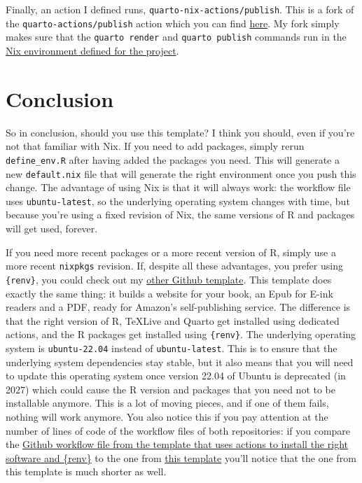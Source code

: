 \documentclass[
  letterpaper,
  paper=6in:9in,
  pagesize=pdftex,
  headinclude=on,
  footinclude=on,
  12pt]{scrbook}
\begin{document}
Finally, an action I defined runs, \texttt{quarto-nix-actions/publish}.
This is a fork of the \texttt{quarto-actions/publish} action which you
can find
\href{https://github.com/quarto-dev/quarto-actions/blob/main/publish/action.yml}{here}.
My fork simply makes sure that the \texttt{quarto\ render} and
\texttt{quarto\ publish} commands run in the
\href{https://github.com/b-rodrigues/quarto-nix-actions/blob/f48f5a7813eb4978a2f557ff45bcc854526fb80b/publish/action.yml\#L58}{Nix
environment defined for the project}.


\chapter{Conclusion}\label{conclusion}

So in conclusion, should you use this template? I think you should, even
if you're not that familiar with Nix. If you need to add packages,
simply rerun \texttt{define\_env.R} after having added the packages you
need. This will generate a new \texttt{default.nix} file that will
generate the right environment once you push this change. The advantage
of using Nix is that it will always work: the workflow file uses
\texttt{ubuntu-latest}, so the underlying operating system changes with
time, but because you're using a fixed revision of Nix, the same
versions of R and packages will get used, forever.

If you need more recent packages or a more recent version of R, simply
use a more recent \texttt{nixpkgs} revision. If, despite all these
advantages, you prefer using \texttt{\{renv\}}, you could check out my
\href{https://github.com/b-rodrigues/kdp_quarto}{other Github template}.
This template does exactly the same thing: it builds a website for your
book, an Epub for E-ink readers and a PDF, ready for Amazon's
self-publishing service. The difference is that the right version of R,
TeXLive and Quarto get installed using dedicated actions, and the R
packages get installed using \texttt{\{renv\}}. The underlying operating
system is \texttt{ubuntu-22.04} instead of \texttt{ubuntu-latest}. This
is to ensure that the underlying system dependencies stay stable, but it
also means that you will need to update this operating system once
version 22.04 of Ubuntu is deprecated (in 2027) which could cause the R
version and packages that you need not to be installable anymore. This
is a lot of moving pieces, and if one of them fails, nothing will work
anymore. You also notice this if you pay attention at the number of
lines of code of the workflow files of both repositories: if you compare
the
\href{https://github.com/b-rodrigues/kdp_quarto/blob/main/.github/workflows/build_book.yml}{Github
workflow file from the template that uses actions to install the right
software and \{renv\}} to the one from
\href{https://github.com/b-rodrigues/quarto_book_nix/blob/master/.github/workflows/build_book.yml}{this
template} you'll notice that the one from this template is much shorter
as well.
\end{document}
